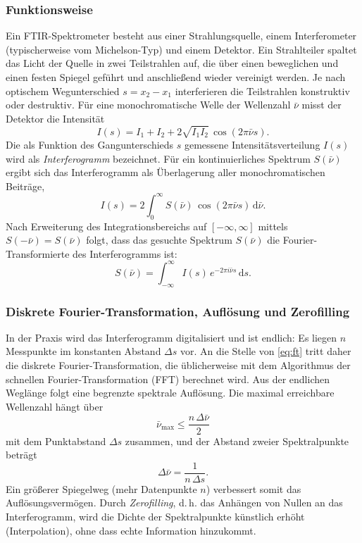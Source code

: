 \documentclass[11pt,a4paper]{article}
\newcommand{\wz}{\ensuremath{\bar{\nu}}}          %
\begin{document}
\subsubsection{Funktionsweise}

Ein FTIR-Spektrometer besteht aus einer Strahlungsquelle, einem
Interferometer (typischerweise vom Michelson-Typ) und einem Detektor. Ein
Strahlteiler spaltet das Licht der Quelle in zwei Teilstrahlen auf, die über
einen beweglichen und einen festen Spiegel geführt und anschließend wieder
vereinigt werden. Je nach optischem Wegunterschied $s = x_2 - x_1$ interferieren
die Teilstrahlen konstruktiv oder destruktiv. Für eine monochromatische Welle der
Wellenzahl \wz{} misst der Detektor die Intensität
\begin{equation}
  I(s) = I_1 + I_2 + 2\sqrt{I_1 I_2}\,\cos(2\pi\wz s) .
\end{equation}
Die als Funktion des Gangunterschieds $s$ gemessene Intensitätsverteilung $I(s)$
wird als \emph{Interferogramm} bezeichnet. Für ein kontinuierliches Spektrum
$S(\wz)$ ergibt sich das Interferogramm als Überlagerung aller
monochromatischen Beiträge,
\begin{equation}
  I(s) = 2\int_0^\infty S(\wz)\,\cos(2\pi\wz s)\,\mathrm{d}\wz .
\end{equation}
Nach Erweiterung des Integrationsbereichs auf $[-\infty,\infty]$ mittels
$S(-\wz) = S(\wz)$ folgt, dass das gesuchte Spektrum $S(\wz)$ die
Fourier-Transformierte des Interferogramms ist:
\begin{equation}
  S(\wz) = \int_{-\infty}^{\infty} I(s)\,e^{-2\pi i \wz s}\,\mathrm{d}s .
  \label{eq:ft}
\end{equation}

\subsubsection{Diskrete Fourier-Transformation, Auflösung und Zerofilling}

In der Praxis wird das Interferogramm digitalisiert und ist endlich: Es liegen
$n$ Messpunkte im konstanten Abstand $\Delta s$ vor. An die Stelle von
\eqref{eq:ft} tritt daher die diskrete Fourier-Transformation, die üblicherweise
mit dem Algorithmus der schnellen Fourier-Transformation (FFT) berechnet wird.
Aus der endlichen Weglänge folgt eine begrenzte spektrale Auflösung. Die maximal
erreichbare Wellenzahl hängt über
\begin{equation}
  \wz_{\max} \le \frac{n\,\Delta\wz}{2}
\end{equation}
mit dem Punktabstand $\Delta s$ zusammen, und der Abstand zweier Spektralpunkte
beträgt
\begin{equation}
  \Delta\wz = \frac{1}{n\,\Delta s} .
  \label{eq:aufloesung}
\end{equation}
Ein größerer Spiegelweg (mehr Datenpunkte $n$) verbessert somit das
Auflösungsvermögen. Durch \emph{Zerofilling}, d.\,h. das Anhängen von Nullen an
das Interferogramm, wird die Dichte der Spektralpunkte künstlich erhöht
(Interpolation), ohne dass echte Information hinzukommt.
\end{document}
